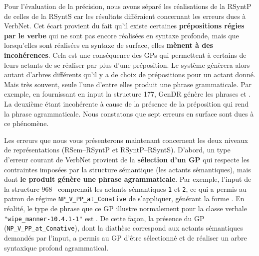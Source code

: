 Pour l'évaluation de la précision, nous avons séparé les réalisations de la \ac{RSyntP} de celles de la \ac{RSyntS} car les résultats différaient concernant les erreurs dues à VerbNet. Cet écart provient du fait qu'il existe certaines \textbf{prépositions régies par le verbe} qui ne sont pas encore réalisées en syntaxe profonde, mais que lorsqu'elles sont réalisées en syntaxe de surface, elles \textbf{mènent à des incohérences}. Cela est une conséquence des \acp{GP} qui permettent à certains de leurs actants de se réaliser par plus d'une préposition. Le système génèrera alors autant d'arbres différents qu'il y a de choix de prépositions pour un actant donné. Mais très souvent, seule l'une d'entre elles produit une phrase grammaticale. Par exemple, en fournissant en input la structure 177, GenDR génère les phrases  et \ungr{}. La deuxième étant incohérente à cause de la présence de la préposition  qui rend la phrase agrammaticale. Nous constatons que sept erreurs en surface sont dues à ce phénomène.

Les erreurs que nous vous présenterons maintenant concernent les deux niveaux de représentations (\ac{RSem}--\ac{RSyntP} et \ac{RSyntP}--\ac{RSyntS}). D'abord, un type d'erreur courant de VerbNet provient de la \textbf{sélection d'un \ac{GP}} qui respecte les contraintes imposées par la structure sémantique (les actants sémantiques), mais dont \textbf{le produit génère une phrase agrammaticale}. Par exemple, l'input de la structure 968-- comprenait les actants sémantiques \texttt{1} et \texttt{2}, ce qui a permis au patron de régime \texttt{NP\_V\_PP\_at\_Conative} de s'appliquer, générant la forme \ungr{}. En réalité, le type de phrase que ce \ac{GP} illustre normalement pour la classe verbale \texttt{"wipe\_manner-10.4.1-1"} est . De cette façon, la présence du \ac{GP} (\texttt{NP\_V\_PP\_at\_Conative}), dont la diathèse correspond aux actants sémantiques demandés par l'input, a permis au \ac{GP} d'être sélectionné et de réaliser un arbre syntaxique profond agrammatical.

